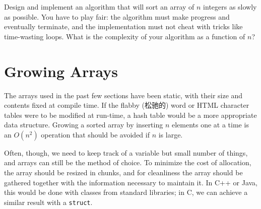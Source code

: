 \begin{exercise}
Design and implement an algorithm that will sort an array of $n$ integers
as slowly as possible. You have to play fair: the algorithm must make
progress and eventually terminate, and the implementation must not cheat
with tricks like time-wasting loops. What is the complexity of your
algorithm as a function of $n$?
\end{exercise}

\section{Growing Arrays}
\label{sec:growing_arrays}

The arrays used in the past few sections have been static, with their size
and contents fixed at compile time. If the flabby (松驰的) word or HTML
character tables were to be modified at run-time, a hash table would be a
more appropriate data structure. Growing a sorted array by inserting $n$
elements one at a time is an $O(n^2)$ operation that should be avoided if
$n$ is large.

Often, though, we need to keep track of a variable but small number of
things, and arrays can still be the method of choice. To minimize the cost
of allocation, the array should be resized in chunks, and for cleanliness
the array should be gathered together with the information necessary to
maintain it. In C++ or Java, this would be done with classes from standard
libraries; in C, we can achieve a similar result with a \verb'struct'.

